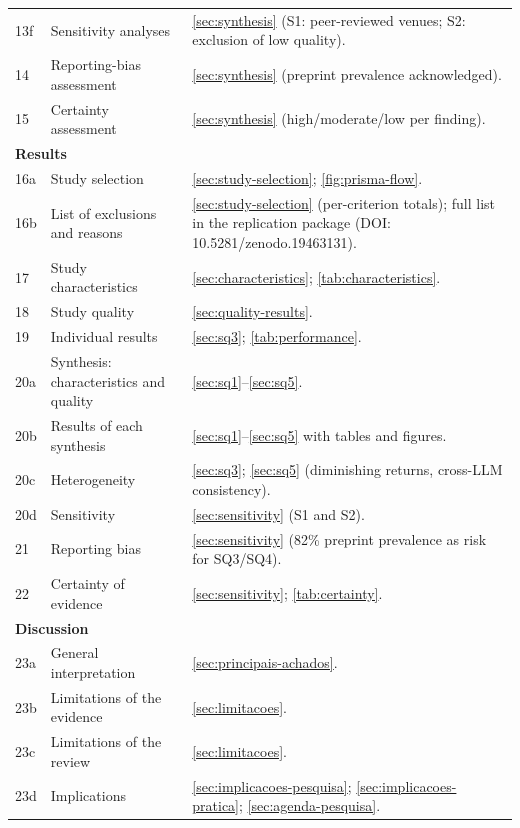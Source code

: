 \begin{longtable}{p{0.5cm}p{4.5cm}p{8.5cm}}
13f & Sensitivity analyses
    & \autoref{sec:synthesis} (S1: peer-reviewed venues; S2: exclusion of low quality). \\
14 & Reporting-bias assessment
   & \autoref{sec:synthesis} (preprint prevalence acknowledged). \\
15 & Certainty assessment
   & \autoref{sec:synthesis} (high/moderate/low per finding). \\
\midrule
\multicolumn{3}{l}{\textbf{Results}} \\
\midrule
16a & Study selection
    & \autoref{sec:study-selection}; \autoref{fig:prisma-flow}. \\
16b & List of exclusions and reasons
    & \autoref{sec:study-selection} (per-criterion totals); full list in the replication
      package (DOI: 10.5281/zenodo.19463131). \\
17  & Study characteristics
    & \autoref{sec:characteristics}; \autoref{tab:characteristics}. \\
18  & Study quality
    & \autoref{sec:quality-results}. \\
19  & Individual results
    & \autoref{sec:sq3}; \autoref{tab:performance}. \\
20a & Synthesis: characteristics and quality
    & \autoref{sec:sq1}--\autoref{sec:sq5}. \\
20b & Results of each synthesis
    & \autoref{sec:sq1}--\autoref{sec:sq5} with tables and figures. \\
20c & Heterogeneity
    & \autoref{sec:sq3}; \autoref{sec:sq5} (diminishing returns, cross-LLM
      consistency). \\
20d & Sensitivity
    & \autoref{sec:sensitivity} (S1 and S2). \\
21  & Reporting bias
    & \autoref{sec:sensitivity} (82\% preprint prevalence as risk for SQ3/SQ4). \\
22  & Certainty of evidence
    & \autoref{sec:sensitivity}; \autoref{tab:certainty}. \\
\midrule
\multicolumn{3}{l}{\textbf{Discussion}} \\
\midrule
23a & General interpretation
    & \autoref{sec:principais-achados}. \\
23b & Limitations of the evidence
    & \autoref{sec:limitacoes}. \\
23c & Limitations of the review
    & \autoref{sec:limitacoes}. \\
23d & Implications
    & \autoref{sec:implicacoes-pesquisa}; \autoref{sec:implicacoes-pratica};
      \autoref{sec:agenda-pesquisa}. \\

\end{longtable}
